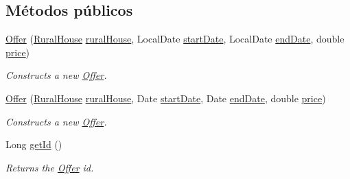 \subsection*{Métodos públicos}
\begin{DoxyCompactItemize}
\item 
\mbox{\hyperlink{classcom_1_1ruralhousejsf_1_1domain_1_1_offer_ac2559262a3321b69ab5abb4ae28ade81}{Offer}} (\mbox{\hyperlink{classcom_1_1ruralhousejsf_1_1domain_1_1_rural_house}{Rural\+House}} \mbox{\hyperlink{classcom_1_1ruralhousejsf_1_1domain_1_1_offer_a87036858904c59c964d2c75137a97323}{rural\+House}}, Local\+Date \mbox{\hyperlink{classcom_1_1ruralhousejsf_1_1domain_1_1_offer_a3c4e8f6eb72413f6f76b1e4b05404ea8}{start\+Date}}, Local\+Date \mbox{\hyperlink{classcom_1_1ruralhousejsf_1_1domain_1_1_offer_a315f9b97f02da79a97fa489db212b5ce}{end\+Date}}, double \mbox{\hyperlink{classcom_1_1ruralhousejsf_1_1domain_1_1_offer_a2106c38f0c490e3263b1364c3ac56b0a}{price}})
\begin{DoxyCompactList}\small\item\em Constructs a new \mbox{\hyperlink{classcom_1_1ruralhousejsf_1_1domain_1_1_offer}{Offer}}. \end{DoxyCompactList}\item 
\mbox{\hyperlink{classcom_1_1ruralhousejsf_1_1domain_1_1_offer_a9e313baa59c91681f9b88a91a3254b65}{Offer}} (\mbox{\hyperlink{classcom_1_1ruralhousejsf_1_1domain_1_1_rural_house}{Rural\+House}} \mbox{\hyperlink{classcom_1_1ruralhousejsf_1_1domain_1_1_offer_a87036858904c59c964d2c75137a97323}{rural\+House}}, Date \mbox{\hyperlink{classcom_1_1ruralhousejsf_1_1domain_1_1_offer_a3c4e8f6eb72413f6f76b1e4b05404ea8}{start\+Date}}, Date \mbox{\hyperlink{classcom_1_1ruralhousejsf_1_1domain_1_1_offer_a315f9b97f02da79a97fa489db212b5ce}{end\+Date}}, double \mbox{\hyperlink{classcom_1_1ruralhousejsf_1_1domain_1_1_offer_a2106c38f0c490e3263b1364c3ac56b0a}{price}})
\begin{DoxyCompactList}\small\item\em Constructs a new \mbox{\hyperlink{classcom_1_1ruralhousejsf_1_1domain_1_1_offer}{Offer}}. \end{DoxyCompactList}\item 
Long \mbox{\hyperlink{classcom_1_1ruralhousejsf_1_1domain_1_1_offer_aebea4d12647f454b017ef7102b70fd90}{get\+Id}} ()
\begin{DoxyCompactList}\small\item\em Returns the \mbox{\hyperlink{classcom_1_1ruralhousejsf_1_1domain_1_1_offer}{Offer}} id. \end{DoxyCompactList}\item 

\end{DoxyCompactItemize}
